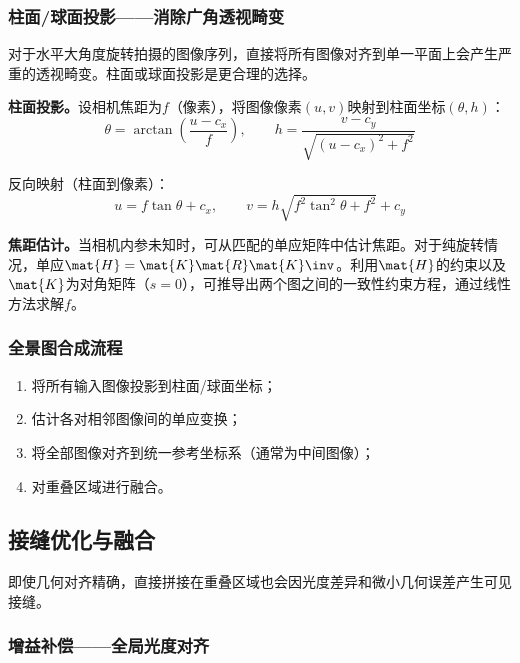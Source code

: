 \subsubsection{柱面/球面投影——消除广角透视畸变}

对于水平大角度旋转拍摄的图像序列，直接将所有图像对齐到单一平面上会产生严重的透视畸变。柱面或球面投影是更合理的选择。

\textbf{柱面投影。}设相机焦距为$f$（像素），将图像像素$(u,v)$映射到柱面坐标$(\theta, h)$：
\begin{equation}
\theta = \arctan\!\left(\frac{u - c_x}{f}\right),
\qquad
h = \frac{v - c_y}{\sqrt{(u-c_x)^2 + f^2}}
\label{eq:cyl-proj}
\end{equation}

反向映射（柱面到像素）：
\begin{equation}
u = f\tan\theta + c_x,
\qquad
v = h\sqrt{f^2\tan^2\theta + f^2} + c_y
\label{eq:cyl-inv}
\end{equation}

\textbf{焦距估计。}当相机内参未知时，可从匹配的单应矩阵中估计焦距。对于纯旋转情况，单应$\mat{H} = \mat{K}\mat{R}\mat{K}\inv$。利用$\mat{H}$的约束以及$\mat{K}$为对角矩阵（$s=0$），可推导出两个图之间的一致性约束方程，通过线性方法求解$f$。

\subsubsection{全景图合成流程}

\begin{enumerate}[leftmargin=*]
  \item 将所有输入图像投影到柱面/球面坐标；
  \item 估计各对相邻图像间的单应变换；
  \item 将全部图像对齐到统一参考坐标系（通常为中间图像）；
  \item 对重叠区域进行融合。
\end{enumerate}

\subsection{接缝优化与融合}
\label{sec:seam-blending}

即使几何对齐精确，直接拼接在重叠区域也会因光度差异和微小几何误差产生可见接缝。

\subsubsection{增益补偿——全局光度对齐}


